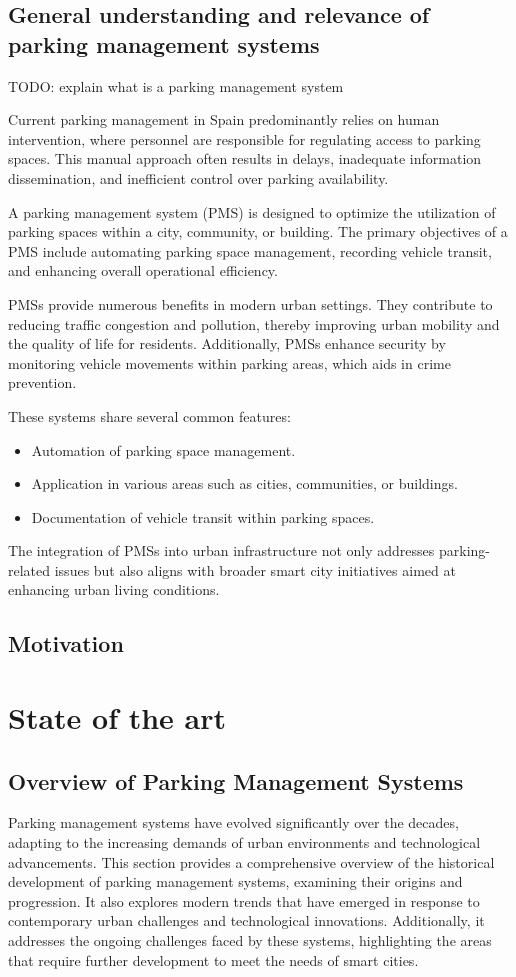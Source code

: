 \documentclass[oneside, 12pt, a4paper, draft]{book}
\begin{document}
\chapter{General understanding and relevance of parking management systems}
\label{sec:org2e7d34c}

TODO: explain what is a parking management system

Current parking management in Spain predominantly relies on human intervention, where personnel are responsible for regulating access to parking spaces. This manual approach often results in delays, inadequate information dissemination, and inefficient control over parking availability.


A parking management system (PMS) is designed to optimize the utilization of parking spaces within a city, community, or building. The primary objectives of a PMS include automating parking space management, recording vehicle transit, and enhancing overall operational efficiency.

PMSs provide numerous benefits in modern urban settings. They contribute to reducing traffic congestion and pollution, thereby improving urban mobility and the quality of life for residents. Additionally, PMSs enhance security by monitoring vehicle movements within parking areas, which aids in crime prevention.

These systems share several common features:
\begin{itemize}
\item Automation of parking space management.
\item Application in various areas such as cities, communities, or buildings.
\item Documentation of vehicle transit within parking spaces.
\end{itemize}

The integration of PMSs into urban infrastructure not only addresses parking-related issues but also aligns with broader smart city initiatives aimed at enhancing urban living conditions.
\chapter{Motivation}
\label{sec:org1fd61c1}

\part{State of the art}
\label{sec:org264b54b}
\chapter{Overview of Parking Management Systems}
\label{sec:orgc93a148}
Parking management systems have evolved significantly over the decades, adapting to the increasing demands of urban environments and technological advancements. This section provides a comprehensive overview of the historical development of parking management systems, examining their origins and progression. It also explores modern trends that have emerged in response to contemporary urban challenges and technological innovations. Additionally, it addresses the ongoing challenges faced by these systems, highlighting the areas that require further development to meet the needs of smart cities.
\end{document}
